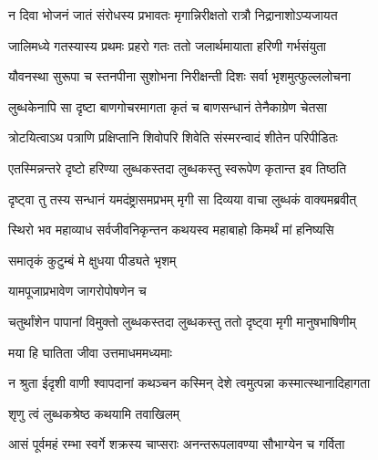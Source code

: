 \twolineshloka
{न दिवा भोजनं जातं संरोधस्य प्रभावतः}
{मृगान्निरीक्षतो रात्रौ निद्रानाशोऽप्यजायत}%

\twolineshloka
{जालिमध्ये गतस्यास्य प्रथमः प्रहरो गतः}
{ततो जलार्थमायाता हरिणी गर्भसंयुता}%

\twolineshloka
{यौवनस्था सुरूपा च स्तनपीना सुशोभना}
{निरीक्षन्ती दिशः सर्वा भृशमुत्फुल्ललोचना}%

\twolineshloka
{लुब्धकेनापि सा दृष्टा बाणगोचरमागता}
{कृतं च बाणसन्धानं तेनैकाग्रेण चेतसा}%

\twolineshloka
{त्रोटयित्वाऽथ पत्राणि प्रक्षिप्तानि शिवोपरि}
{शिवेति संस्मरन्वादं शीतेन परिपीडितः}%

\twolineshloka
{एतस्मिन्नन्तरे दृष्टो हरिण्या लुब्धकस्तदा}
{लुब्धकस्तु स्वरूपेण कृतान्त इव तिष्ठति}%

\twolineshloka
{दृष्ट्वा तु तस्य सन्धानं यमदंष्ट्रासमप्रभम्}
{मृगी सा दिव्यया वाचा लुब्धकं वाक्यमब्रवीत्}%


\twolineshloka
{स्थिरो भव महाव्याध सर्वजीवनिकृन्तन}
{कथयस्व महाबाहो किमर्थं मां हनिष्यसि}%



\onelineshloka
{समातृकं कुटुम्बं मे क्षुधया पीड्यते भृशम्}%



\onelineshloka
{याम\footnotemark{}पूजाप्रभावेण जागरोपोषणेन च}%

\twolineshloka
{चतुर्थांशेन पापानां विमुक्तो लुब्धकस्तदा}
{लुब्धकस्तु ततो दृष्ट्वा मृगी मानुषभाषिणीम्}%


\onelineshloka
{मया हि घातिता जीवा उत्तमाधममध्यमाः}%

\twolineshloka
{न श्रुता ईदृशी वाणी श्वापदानां कथञ्चन}
{कस्मिन् देशे त्वमुत्पन्ना कस्मात्स्थानादिहागता}%


\onelineshloka
{शृणु त्वं लुब्धकश्रेष्ठ कथयामि तवाखिलम्}%

\twolineshloka
{आसं पूर्वमहं रम्भा स्वर्गे शक्रस्य चाप्सराः}
{अनन्तरूपलावण्या सौभाग्येन च गर्विता}%

